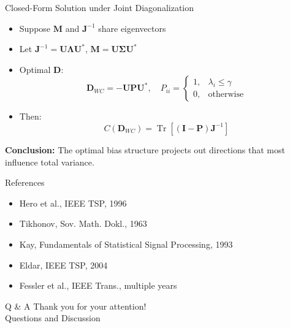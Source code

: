\documentclass{beamer}
\begin{document}
\begin{frame}{Closed-Form Solution under Joint Diagonalization}
\begin{itemize}
    \item Suppose $\mathbf{M}$ and $\mathbf{J}^{-1}$ share eigenvectors
    \item Let $\mathbf{J}^{-1} = \mathbf{U} \boldsymbol{\Lambda} \mathbf{U}^*$, $\mathbf{M} = \mathbf{U} \boldsymbol{\Sigma} \mathbf{U}^*$
    \item Optimal $\mathbf{D}$:
    \[
        \mathbf{D}_{WC} = -\mathbf{U} \mathbf{P} \mathbf{U}^*, \quad P_{ii} = 
        \begin{cases}
            1, & \lambda_i \leq \gamma \\
            0, & \text{otherwise}
        \end{cases}
    \]
    \item Then:
    \[
        C(\mathbf{D}_{WC}) = \operatorname{Tr}[(\mathbf{I} - \mathbf{P}) \mathbf{J}^{-1}]
    \]
\end{itemize}
\textbf{Conclusion:} The optimal bias structure projects out directions that most influence total variance.
\end{frame}




\begin{frame}{References}
  \scriptsize
  \begin{itemize}
    \item Hero et al., IEEE TSP, 1996
    \item Tikhonov, Sov. Math. Dokl., 1963
    \item Kay, Fundamentals of Statistical Signal Processing, 1993
    \item Eldar, IEEE TSP, 2004
    \item Fessler et al., IEEE Trans., multiple years
  \end{itemize}
\end{frame}

\begin{frame}{Q \& A}
  \centering
  Thank you for your attention! \\
  Questions and Discussion
\end{frame}
\end{document}
